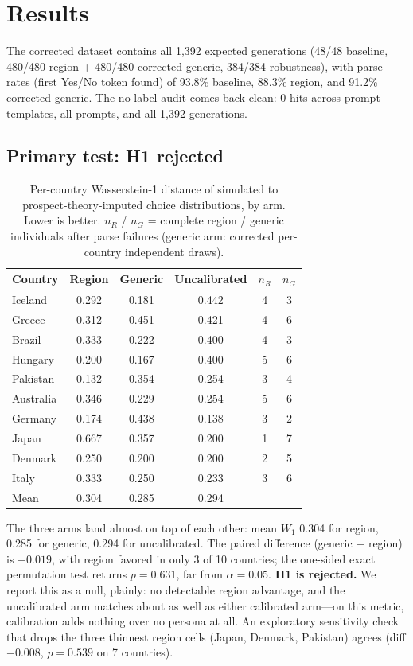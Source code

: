 \documentclass[10pt,letterpaper]{article}
\begin{document}
\section{Results}

The corrected dataset contains all 1,392 expected generations (48/48
baseline, 480/480 region + 480/480 corrected generic, 384/384 robustness),
with parse rates (first Yes/No token found) of 93.8\% baseline, 88.3\%
region, and 91.2\% corrected generic. The no-label audit comes back clean:
0 hits across prompt templates, all prompts, and all 1,392 generations.

\subsection{Primary test: H1 rejected}

\begin{table}[t]
\centering
\caption{Per-country Wasserstein-1 distance of simulated to
prospect-theory-imputed choice distributions, by arm. Lower is better.
$n_R$ / $n_G$ = complete region / generic individuals after parse failures
(generic arm: corrected per-country independent draws).}
\label{tab:w1}
\begin{tabular}{lccccc}
\toprule
Country & Region & Generic & Uncalibrated & $n_R$ & $n_G$ \\
\midrule
Iceland & 0.292 & 0.181 & 0.442 & 4 & 3 \\
Greece & 0.312 & 0.451 & 0.421 & 4 & 6 \\
Brazil & 0.333 & 0.222 & 0.400 & 4 & 3 \\
Hungary & 0.200 & 0.167 & 0.400 & 5 & 6 \\
Pakistan & 0.132 & 0.354 & 0.254 & 3 & 4 \\
Australia & 0.346 & 0.229 & 0.254 & 5 & 6 \\
Germany & 0.174 & 0.438 & 0.138 & 3 & 2 \\
Japan & 0.667 & 0.357 & 0.200 & 1 & 7 \\
Denmark & 0.250 & 0.200 & 0.200 & 2 & 5 \\
Italy & 0.333 & 0.250 & 0.233 & 3 & 6 \\
\midrule
Mean & 0.304 & 0.285 & 0.294 & & \\
\bottomrule
\end{tabular}
\end{table}

The three arms land almost on top of each other: mean $W_1$ 0.304 for
region, 0.285 for generic, 0.294 for uncalibrated. The paired difference
(generic $-$ region) is $-0.019$, with region favored in only 3 of 10
countries; the one-sided exact permutation test returns $p=0.631$, far from
$\alpha=0.05$. \textbf{H1 is rejected.} We report this as a null, plainly:
no detectable region advantage, and the uncalibrated arm matches about as
well as either calibrated arm---on this metric, calibration adds nothing
over no persona at all. An exploratory sensitivity check that drops the
three thinnest region cells (Japan, Denmark, Pakistan) agrees
(diff $-0.008$, $p=0.539$ on 7 countries).
\end{document}
